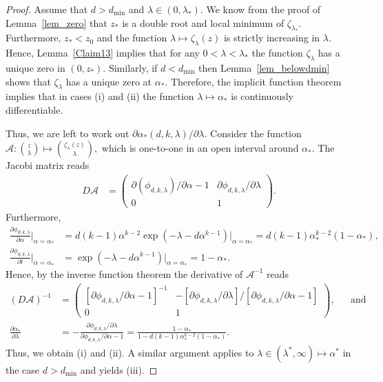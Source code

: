 \documentclass[10pt,reqno]{amsart}
\numberwithin{equation}{section}
\newcommand\dmin{d_{\mathrm{min}}}
\newcommand\cA{\mathcal A}
\newcommand\brk[1]{\left\lbrack{#1}\right\rbrack}
\newcommand\Lem{Lemma}
\newcommand{\zt}{\zeta_\lambda}
\begin{document}
\begin{proof}
	Assume that $d>\dmin$ and $\lambda\in(0,\lambda_*)$.
	We know from the proof of \Lem~\ref{lem_zero} that $z_*$ is a double root and local minimum of $\zeta_{\lambda_*}$.
	Furthermore, $z_*<z_0$ and the function $\lambda\mapsto\zeta_\lambda(z)$ is strictly increasing in $\lambda$. Hence, \Lem~\ref{Claim13} implies that for any $0<\lambda<\lambda_*$ the function $\zt$ has a unique zero in $(0,z_*)$.
	Similarly, if $d<\dmin$ then \Lem~\ref{lem_belowdmin} shows that $\zt$ has a unique zero at $\alpha_*$.
	Therefore, the implicit function theorem implies that in cases (i) and (ii) the function $\lambda\mapsto\alpha_*$ is continuously differentiable.


Thus, we are left to work out $\partial \alpha_*(d,k,\lambda)/\partial \lambda$.
	Consider the function $\cA:\binom z \lambda\mapsto\binom{\zt(z)}{\lambda},$ which is one-to-one in an open interval around $\alpha_*$.
	The Jacobi matrix reads
	\begin{align*}
		D\cA&=\begin{pmatrix} \partial(\phi_{d,k,\lambda})/\partial\alpha-1&\partial\phi_{d,k,\lambda}/\partial \lambda\\0&1 \end{pmatrix}.
	\end{align*}
	Furthermore,
	\begin{align*}
		\frac{\partial\phi_{d,k,\lambda}}{\partial\alpha}\big|_{\alpha=\alpha_*}&=d(k-1)\alpha^{k-2}\exp(-\lambda-d\alpha^{k-1})\big|_{\alpha=\alpha_*}=d(k-1)\alpha_*^{k-2}(1-\alpha_*),\\
		\frac{\partial\phi_{d,k,\lambda}}{\partial t}\big|_{\alpha=\alpha_*}&=\exp(-\lambda-d\alpha^{k-1})\big|_{\alpha=\alpha_*}=1-\alpha_*.
	\end{align*}
	Hence, by the inverse function theorem the derivative of $\cA^{-1}$ reads
	\begin{align*}
		(D\cA)^{-1}&=\begin{pmatrix} \brk{\partial\phi_{d,k,\lambda}/\partial\alpha-1}^{-1}&-\brk{\partial\phi_{d,k,\lambda}/\partial \lambda}/\brk{\partial\phi_{d,k,\lambda}/\partial\alpha-1}\\0&1 \end{pmatrix},&&\mbox{and thus}\\
	\frac{\partial\alpha_*}{\partial \lambda}&=-\frac{\partial\phi_{d,k,\lambda}/\partial \lambda}{\partial\phi_{d,k,\lambda}/\partial\alpha-1}=\frac{1- \alpha_*}{1-d(k-1)\alpha_*^{k-2}(1-\alpha_*)}.
	\end{align*}
	Thus, we obtain (i) and (ii).
	A similar argument applies to $\lambda\in(\lambda^*,\infty)\mapsto\alpha^*$ in the case $d>\dmin$ and yields (iii).
\end{proof}
\end{document}
